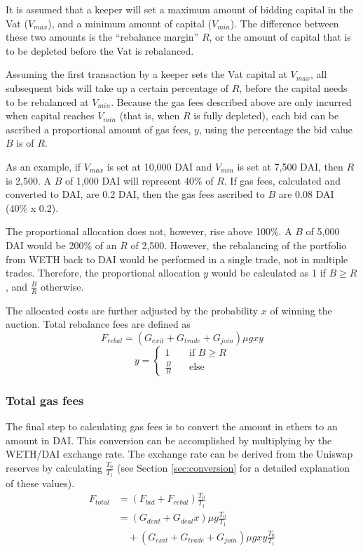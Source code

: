 \documentclass[conference]{IEEEtran}
\begin{document}
It is assumed that a keeper will set a maximum amount of bidding capital in the Vat ($V_{max}$), and a minimum amount of capital ($V_{min}$). The difference between these two amounts is the ``rebalance margin'' $R$, or the amount of capital that is to be depleted before the Vat is rebalanced. 

Assuming the first transaction by a keeper sets the Vat capital at $V_{max}$, all subsequent bids will take up a certain percentage of $R$, before the capital needs to be rebalanced at $V_{min}$. Because the gas fees described above are only incurred when capital reaches $V_{min}$ (that is, when $R$ is fully depleted), each bid can be ascribed a proportional amount of gas fees, $y$, using the percentage the bid value $B$ is of $R$.

As an example, if $V_{max}$ is set at 10,000 DAI and $V_{min}$ is set at 7,500 DAI, then $R$ is 2,500. A $B$ of 1,000 DAI will represent 40\% of $R$. If gas fees, calculated and converted to DAI, are 0.2 DAI, then the gas fees ascribed to $B$ are 0.08 DAI (40\% x 0.2).

The proportional allocation does not, however, rise above 100\%. A $B$ of 5,000 DAI would be 200\% of an $R$ of 2,500. However, the rebalancing of the portfolio from WETH back to DAI would be performed in a single trade, not in multiple trades. Therefore, the proportional allocation $y$ would be calculated as 1 if $B \geq R$, and $\frac{B}{R}$ otherwise.

The allocated costs are further adjusted by the probability $x$ of winning the auction. Total rebalance fees are defined as 
\begin{equation}
     F_{rebal} = (G_{exit} + G_{trade} + G_{join}) \mu g x y
\end{equation}
\begin{equation}
\label{eq:4}
        y = 
        \begin{cases}
            1              &\quad \text{if } B\geq R\\
            \frac{B}{R}    &\quad \text{else}
        \end{cases}
\end{equation}

\subsubsection{Total gas fees}
The final step to calculating gas fees is to convert the amount in ethers to an amount in DAI. This conversion can be accomplished by multiplying by the WETH/DAI exchange rate. The exchange rate can be derived from the Uniswap reserves by calculating $\frac{T_0}{T_1}$ (see Section \ref{sec:conversion} for a detailed explanation of these values).
\begin{equation}
    \begin{split}
        F_{total} &= (F_{bid} + F_{rebal})  \frac{T_0}{T_1} \\
        & = (G_{dent} + G_{deal} x) \mu g \frac{T_0}{T_1} \\  
        & \quad + (G_{exit} + G_{trade} + G_{join}) \mu g x y \frac{T_0}{T_1} \\
    \end{split}
\end{equation}
\end{document}

